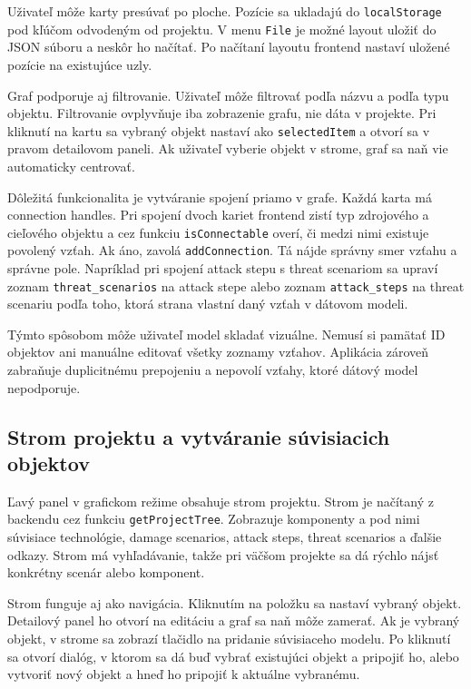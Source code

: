 \documentclass[11pt]{article}
\begin{document}
Uživateľ môže karty presúvať po ploche. Pozície sa ukladajú do \texttt{localStorage} pod kľúčom odvodeným od projektu. V menu \texttt{File} je možné layout uložiť do JSON súboru a neskôr ho načítať. Po načítaní layoutu frontend nastaví uložené pozície na existujúce uzly.

Graf podporuje aj filtrovanie. Uživateľ môže filtrovať podľa názvu a podľa typu objektu. Filtrovanie ovplyvňuje iba zobrazenie grafu, nie dáta v projekte. Pri kliknutí na kartu sa vybraný objekt nastaví ako \texttt{selectedItem} a otvorí sa v pravom detailovom paneli. Ak uživateľ vyberie objekt v strome, graf sa naň vie automaticky centrovať.

Dôležitá funkcionalita je vytváranie spojení priamo v grafe. Každá karta má connection handles. Pri spojení dvoch kariet frontend zistí typ zdrojového a cieľového objektu a cez funkciu \texttt{isConnectable} overí, či medzi nimi existuje povolený vzťah. Ak áno, zavolá \texttt{addConnection}. Tá nájde správny smer vzťahu a správne pole. Napríklad pri spojení attack stepu s threat scenariom sa upraví zoznam \texttt{threat\_scenarios} na attack stepe alebo zoznam \texttt{attack\_steps} na threat scenariu podľa toho, ktorá strana vlastní daný vzťah v dátovom modeli.

Týmto spôsobom môže uživateľ model skladať vizuálne. Nemusí si pamätať ID objektov ani manuálne editovať všetky zoznamy vzťahov. Aplikácia zároveň zabraňuje duplicitnému prepojeniu a nepovolí vzťahy, ktoré dátový model nepodporuje.

\subsection{Strom projektu a vytváranie súvisiacich objektov}

Ľavý panel v grafickom režime obsahuje strom projektu. Strom je načítaný z backendu cez funkciu \texttt{getProjectTree}. Zobrazuje komponenty a pod nimi súvisiace technológie, damage scenarios, attack steps, threat scenarios a ďalšie odkazy. Strom má vyhľadávanie, takže pri väčšom projekte sa dá rýchlo nájsť konkrétny scenár alebo komponent.

Strom funguje aj ako navigácia. Kliknutím na položku sa nastaví vybraný objekt. Detailový panel ho otvorí na editáciu a graf sa naň môže zamerať. Ak je vybraný objekt, v strome sa zobrazí tlačidlo na pridanie súvisiaceho modelu. Po kliknutí sa otvorí dialóg, v ktorom sa dá buď vybrať existujúci objekt a pripojiť ho, alebo vytvoriť nový objekt a hneď ho pripojiť k aktuálne vybranému.
\end{document}
